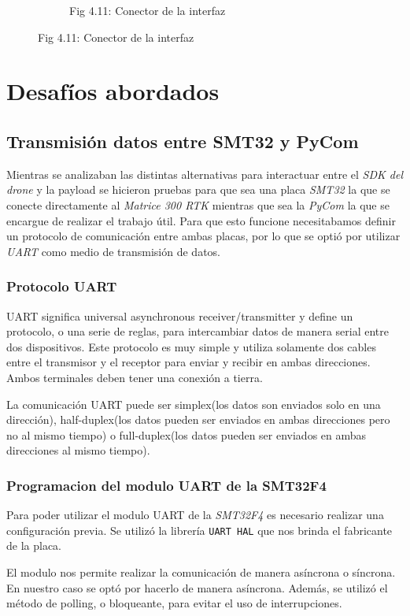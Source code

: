 \documentclass[12pt]{article}
\begin{document}
\begin{figure}[ht]
\begin{subfigure}[b]{0.45\linewidth}
    \caption{Fig 4.11: Conector de la interfaz}
  \end{subfigure}
\end{figure}

\vspace*{200pt}
\newpage
\section{Desafíos abordados}

\subsection{Transmisión datos entre SMT32 y PyCom}
Mientras se analizaban las distintas alternativas para interactuar entre el \textit{SDK del drone} y la payload se hicieron pruebas para que sea una placa \textit{SMT32} la que se conecte directamente al \textit{Matrice 300 RTK} mientras que sea la \textit{PyCom} la que se encargue de  realizar el trabajo útil. Para que esto funcione necesitabamos definir un protocolo de comunicación entre ambas placas, por lo que se optió por utilizar \textit{UART} como medio de transmisión de datos.

\subsubsection{Protocolo UART}
UART significa universal asynchronous receiver/transmitter y define un protocolo, o una serie de reglas, para intercambiar datos de manera serial entre dos dispositivos. Este protocolo es muy simple y utiliza solamente dos cables entre el transmisor y el receptor para enviar y recibir en ambas direcciones. Ambos terminales deben tener una conexión a tierra. 

La comunicación UART puede ser simplex(los datos son enviados solo en una dirección), half-duplex(los datos pueden ser enviados en ambas direcciones pero no al mismo tiempo) o full-duplex(los datos pueden ser enviados en ambas direcciones al mismo tiempo).

\subsubsection{Programacion del modulo UART de la SMT32F4}
Para poder utilizar el modulo UART de la \textit{SMT32F4} es necesario realizar una configuración previa. Se utilizó la librería \texttt{UART HAL} que nos brinda el fabricante de la placa. 

El modulo nos permite realizar la comunicación de manera asíncrona o síncrona. En nuestro caso se optó por hacerlo de manera asíncrona. Además, se utilizó el método de polling, o bloqueante, para evitar el uso de interrupciones. 
\end{document}
